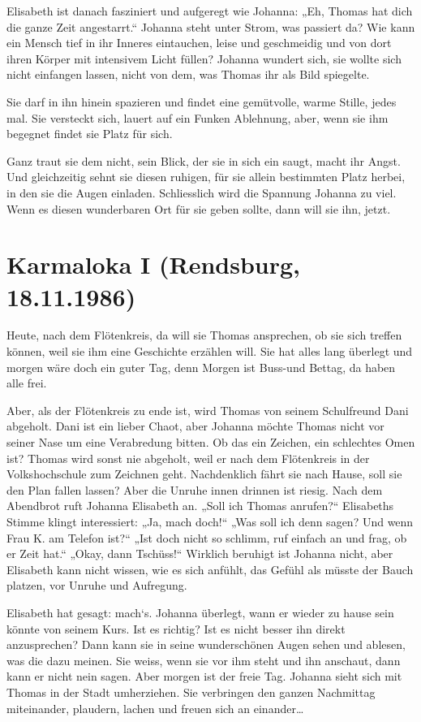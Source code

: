 \documentclass[10pt,a5paper]{book}
\begin{document}
Elisabeth ist danach fasziniert und aufgeregt wie Johanna: „Eh, Thomas hat dich die ganze Zeit angestarrt.“ Johanna steht unter Strom, was passiert da? Wie kann ein Mensch tief in ihr Inneres eintauchen, leise und geschmeidig und von dort ihren Körper mit intensivem Licht füllen? Johanna wundert sich, sie wollte sich nicht einfangen lassen, nicht von dem, was Thomas ihr als Bild spiegelte. 

Sie darf in ihn hinein spazieren und findet eine gemütvolle, warme Stille, jedes mal. Sie versteckt sich, lauert auf ein Funken Ablehnung, aber, wenn sie ihm begegnet findet sie Platz für sich. 

Ganz traut sie dem nicht, sein Blick, der sie in sich ein saugt, macht ihr Angst. Und gleichzeitig sehnt sie diesen ruhigen, für sie allein bestimmten Platz herbei, in den sie die Augen einladen. Schliesslich wird die Spannung Johanna zu viel. Wenn es diesen wunderbaren Ort für sie geben sollte, dann will sie ihn, jetzt.


\section*{Karmaloka I (Rendsburg, 18.11.1986)}


Heute, nach dem Flötenkreis, da will sie Thomas ansprechen, ob sie sich treffen können, weil sie ihm eine Geschichte erzählen will. Sie hat alles lang überlegt und morgen wäre doch ein guter Tag, denn Morgen ist Buss-und Bettag, da haben alle frei.

Aber, als der Flötenkreis zu ende ist, wird Thomas von seinem Schulfreund Dani abgeholt. Dani ist ein lieber Chaot, aber Johanna möchte Thomas nicht vor seiner Nase um eine Verabredung bitten. Ob das ein Zeichen, ein schlechtes Omen ist? Thomas wird sonst nie abgeholt, weil er nach dem Flötenkreis in der Volkshochschule zum Zeichnen geht. Nachdenklich fährt sie nach Hause, soll sie den Plan fallen lassen? Aber die Unruhe innen drinnen ist riesig. Nach dem Abendbrot ruft Johanna Elisabeth an. „Soll ich Thomas anrufen?“ Elisabeths Stimme klingt interessiert: „Ja, mach doch!“ „Was soll ich denn sagen? Und wenn Frau K. am Telefon ist?“ „Ist doch nicht so schlimm, ruf einfach an und frag, ob er Zeit hat.“ „Okay, dann Tschüss!“ Wirklich beruhigt ist Johanna nicht, aber Elisabeth kann nicht wissen, wie es sich anfühlt, das Gefühl als müsste der Bauch platzen, vor Unruhe und Aufregung.

Elisabeth hat gesagt: mach`s. Johanna überlegt, wann er wieder zu hause sein könnte von seinem Kurs. Ist es richtig? Ist es nicht besser ihn direkt anzusprechen? Dann kann sie in seine wunderschönen Augen sehen und ablesen, was die dazu meinen. Sie weiss, wenn sie vor ihm steht und ihn anschaut, dann kann er nicht nein sagen. Aber morgen ist der freie Tag. Johanna  sieht sich mit Thomas in der Stadt umherziehen. Sie verbringen den ganzen Nachmittag miteinander, plaudern, lachen und freuen sich an einander\dots 
\end{document}
